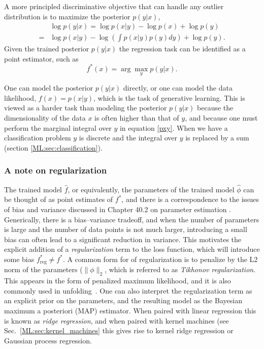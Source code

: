 A more principled discriminative objective that can handle any outlier distribution
is to maximize the posterior $p(y|x)$, 
\begin{eqnarray}
    &\log p(y|x) = \log p(x|y) - \log p(x) + \log p(y) \nonumber\\
    =& \log p(x|y) - \log (\int p(x|y) p(y) dy) + \log p(y). 
    \label{pxy}
\end{eqnarray}
Given the trained posterior $p(y|x)$
the regression task can be identified 
as a point estimator, such as 
\begin{equation}
    f^*(x)=\arg \max_y p(y|x). 
\end{equation}

One can model the posterior $p(y|x)$ directly, or 
one can model the 
data likelihood, $f(x)=p(x|y)$, which is the task of 
generative learning. This is viewed as a 
harder task than modeling the posterior $p(y|x)$ because 
the dimensionality of the data $x$ is 
often higher than that of $y$, and 
because one must perform the marginal 
integral over $y$ in equation \ref{pxy}. 
When we have a classification problem $y$ is discrete and the integral over $y$ is 
replaced by a sum (section \ref{ML:sec:classification}). 


\subsubsection{A note on regularization}
\label{regularization}

The trained model $\hat{f}$, or equivalently, the parameters of the trained model $\hat{\phi}$ can be thought of as point estimates of $f^*$, and there is a correspondence to the issues of bias and variance discussed in Chapter 40.2 on parameter estimation . Generically, there is a bias--variance tradeoff, and when the number of parameters is large and the number of data points is not much larger, introducing a small bias can often lead to a significant reduction in variance. This motivates the explicit addition of a \textit{regularization} term to the loss function, which will introduce some bias $f^*_\textrm{reg} \ne f^*$. A common form for of regularization is to penalize by the L2 norm of the parameters (\ie $\lVert \phi \rVert_2$, which is referred to as \textit{Tikhonov regularization}. This appears in the form of penalized maximum likelihood, and it is also commonly used in unfolding~\cite{Kuusela:2015xqa}. One can also interpret the regularization term as an explicit prior on the parameters, and the resulting model as the Bayesian maximum a posteriori (MAP) estimator. When paired with linear regression this is known as \textit{ridge regression}, and when paired with kernel machines (see Sec.~\ref{ML:sec:kernel_machines} this gives rise to kernel ridge regression or Gaussian process regression. 

